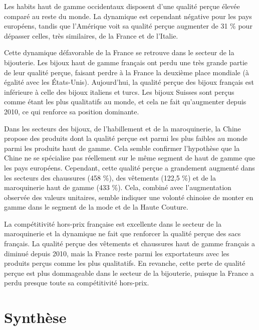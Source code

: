 \documentclass[french,10pt,a4paper]{article}
\begin{document}
Les habits haut de gamme occidentaux disposent d'une qualité perçue élevée comparé au reste du monde. La dynamique est cependant négative pour les pays européens, tandis que l'Amérique voit sa qualité perçue augmenter de 31 \% pour dépasser celles, très similaires, de la France et de l'Italie.

Cette dynamique défavorable de la France se retrouve dans le secteur de la bijouterie. Les bijoux haut de gamme français ont perdu une très grande partie de leur qualité perçue, faisant perdre à la France la deuxième place mondiale (à égalité avec les États-Unis). Aujourd'hui, la qualité perçue des bijoux français est inférieure à celle des bijoux italiens et turcs. Les bijoux Suisses sont perçus comme étant les plus qualitatifs au monde, et cela ne fait qu'augmenter depuis 2010, ce qui renforce sa position dominante. 

Dans les secteurs des bijoux, de l'habillement et de la maroquinerie, la Chine propose des produits dont la qualité perçue est parmi les plus faibles au monde parmi les produits haut de gamme. Cela semble confirmer l'hypothèse que la Chine ne se spécialise pas réellement sur le même segment de haut de gamme que les pays européens. Cependant, cette qualité perçue a grandement augmenté dans les secteurs des chaussures (458 \%), des vêtements (122,5 \%) et de la maroquinerie haut de gamme (433 \%). Cela, combiné avec l'augmentation observée des valeurs unitaires, semble indiquer une volonté chinoise de monter en gamme dans le segment de la mode et de la Haute Couture.

\bigskip

La compétitivité hors-prix française est excellente dans le secteur de la maroquinerie et la dynamique ne fait que renforcer la qualité perçue des sacs français. La qualité perçue des vêtements et chaussures haut de gamme français a diminué depuis 2010, mais la France reste parmi les exportateurs avec les produits perçus comme les plus qualitatifs. En revanche, cette perte de qualité perçue est plus dommageable dans le secteur de la bijouterie, puisque la France a perdu presque toute sa compétitivité hors-prix.





\newpage
\section{Synthèse}
\end{document}

